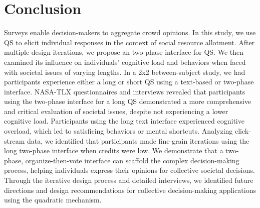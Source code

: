 \section{Conclusion}
Surveys enable decision-makers to aggregate crowd opinions. In this study, we use QS to elicit individual responses in the context of social resource allotment. After multiple design iterations, we propose an two-phase interface for QS. We then examined its influence on individuals' cognitive load and behaviors when faced with societal issues of varying lengths. In a 2x2 between-subject study, we had participants experience either a long or short QS using a text-based or two-phase interface. NASA-TLX questionnaires and interviews revealed that participants using the two-phase interface for a long QS demonstrated a more comprehensive and critical evaluation of societal issues, despite not experiencing a lower cognitive load. Participants using the long text interface experienced cognitive overload, which led to satisficing behaviors or mental shortcuts. Analyzing click-stream data, we identified that participants made fine-grain iterations using the long two-phase interface when credits were low. We demonstrate that a two-phase, organize-then-vote interface can scaffold the complex decision-making process, helping individuals express their opinions for collective societal decisions. Through the iterative design process and detailed interviews, we identified future directions and design recommendations for collective decision-making applications using the quadratic mechanism.